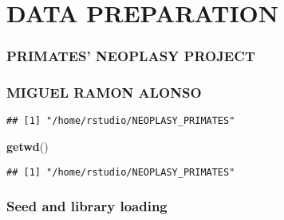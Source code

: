 \documentclass[
]{article}
\author{}
\date{\vspace{-2.5em}}
\newenvironment{Shaded}{\begin{snugshade}}{\end{snugshade}}
\newcommand{\AttributeTok}[1]{\textcolor[rgb]{0.13,0.29,0.53}{#1}}
\newcommand{\FunctionTok}[1]{\textcolor[rgb]{0.13,0.29,0.53}{\textbf{#1}}}
\newcommand{\NormalTok}[1]{#1}
\newcommand{\SpecialCharTok}[1]{\textcolor[rgb]{0.81,0.36,0.00}{\textbf{#1}}}
\newcommand{\StringTok}[1]{\textcolor[rgb]{0.31,0.60,0.02}{#1}}
\begin{document}
\hypertarget{data-preparation}{%
\section{DATA PREPARATION}\label{data-preparation}}

\hypertarget{primates-neoplasy-project}{%
\subsubsection{PRIMATES' NEOPLASY
PROJECT}\label{primates-neoplasy-project}}

\hypertarget{miguel-ramon-alonso}{%
\subsubsection{MIGUEL RAMON ALONSO}\label{miguel-ramon-alonso}}

\begin{Shaded}
\end{Shaded}

\begin{verbatim}
## [1] "/home/rstudio/NEOPLASY_PRIMATES"
\end{verbatim}

\begin{Shaded}
\begin{Highlighting}[]
\FunctionTok{getwd}\NormalTok{()}
\end{Highlighting}
\end{Shaded}

\begin{verbatim}
## [1] "/home/rstudio/NEOPLASY_PRIMATES"
\end{verbatim}

\hypertarget{seed-and-library-loading}{%
\subsubsection{Seed and library
loading}\label{seed-and-library-loading}}
\end{document}

